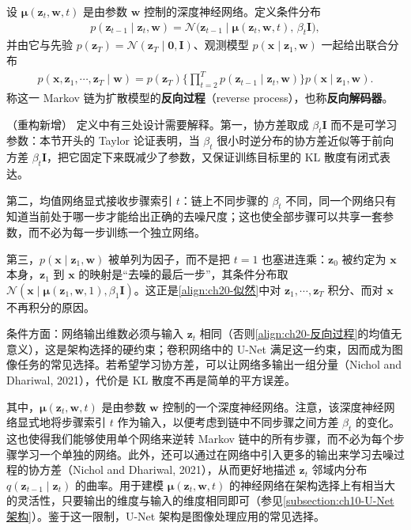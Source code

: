 \documentclass[../../main.tex]{subfiles}
\begin{document}
\begin{definition}[反向过程]\label{definition:ch20-反向过程}
设 $\bm{\mu}(\bm{z}_t,\bm{w},t)$ 是由参数 $\bm{w}$ 控制的深度神经网络。定义条件分布
\begin{align}
p(\bm{z}_{t-1}\mid\bm{z}_t,\bm{w})=\mathcal{N}\big(\bm{z}_{t-1}\mid\bm{\mu}(\bm{z}_t,\bm{w},t),\,\beta_t\bm{I}\big),
\label{align:ch20-反向过程}
\end{align}
并由它与先验 $p(\bm{z}_T)=\mathcal{N}(\bm{z}_T\mid\bm{0},\bm{I})$、观测模型 $p(\bm{x}\mid\bm{z}_1,\bm{w})$ 一起给出联合分布
\begin{align}
p(\bm{x},\bm{z}_1,\cdots,\bm{z}_T\mid\bm{w})=p(\bm{z}_T)\Big\{\prod_{t=2}^{T}p(\bm{z}_{t-1}\mid\bm{z}_t,\bm{w})\Big\}p(\bm{x}\mid\bm{z}_1,\bm{w}).
\label{align:ch20-反向联合}
\end{align}
称这一 Markov 链为扩散模型的\textbf{反向过程}（reverse process），也称\textbf{反向解码器}。
\end{definition}

\begin{remark}（重构新增）
定义中有三处设计需要解释。第一，协方差取成 $\beta_t\bm{I}$ 而不是可学习参数：本节开头的 Taylor 论证表明，当 $\beta_t$ 很小时逆分布的协方差近似等于前向方差 $\beta_t\bm{I}$，把它固定下来既减少了参数，又保证训练目标里的 KL 散度有闭式表达。\par
第二，均值网络显式接收步骤索引 $t$：链上不同步骤的 $\beta_t$ 不同，同一个网络只有知道当前处于哪一步才能给出正确的去噪尺度；这也使全部步骤可以共享一套参数，而不必为每一步训练一个独立网络。\par
第三，$p(\bm{x}\mid\bm{z}_1,\bm{w})$ 被单列为因子，而不是把 $t=1$ 也塞进连乘：$\bm{z}_0$ 被约定为 $\bm{x}$ 本身，$\bm{z}_1$ 到 $\bm{x}$ 的映射是“去噪的最后一步”，其条件分布取 $\mathcal{N}(\bm{x}\mid\bm{\mu}(\bm{z}_1,\bm{w},1),\beta_1\bm{I})$。这正是\eqref{align:ch20-似然}中对 $\bm{z}_1,\cdots,\bm{z}_T$ 积分、而对 $\bm{x}$ 不再积分的原因。\par
条件方面：网络输出维数必须与输入 $\bm{z}_t$ 相同（否则\eqref{align:ch20-反向过程}的均值无意义），这是架构选择的硬约束；卷积网络中的 U-Net 满足这一约束，因而成为图像任务的常见选择。若希望学习协方差，可以让网络多输出一组分量（Nichol and Dhariwal, 2021），代价是 KL 散度不再是简单的平方误差。
\end{remark}

其中，$\bm{\mu}(\bm{z}_t,\bm{w},t)$ 是由参数 $\bm{w}$ 控制的一个深度神经网络。注意，该深度神经网络显式地将步骤索引 $t$ 作为输入，以便考虑到链中不同步骤之间方差 $\beta_t$ 的变化。这也使得我们能够使用单个网络来逆转 Markov 链中的所有步骤，而不必为每个步骤学习一个单独的网络。此外，还可以通过在网络中引入更多的输出来学习去噪过程的协方差（Nichol and Dhariwal, 2021），从而更好地描述 $\bm{z}_t$ 邻域内分布 $q(\bm{z}_{t-1}\mid\bm{z}_t)$ 的曲率。用于建模 $\bm{\mu}(\bm{z}_t,\bm{w},t)$ 的神经网络在架构选择上有相当大的灵活性，只要输出的维度与输入的维度相同即可（参见\cref{subsection:ch10-U-Net架构}）。鉴于这一限制，U-Net 架构是图像处理应用的常见选择。
\end{document}
